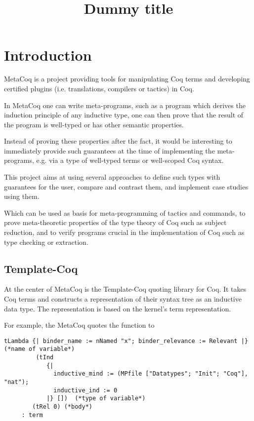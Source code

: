 \documentclass[a4paper,UKenglish,cleveref, autoref, thm-restate]{lipics-v2021}
\title{Dummy title} %
\begin{document}

\section{Introduction}



MetaCoq \cite{metacoq} is a project providing tools for manipulating Coq terms and developing certified plugins (i.e. translations, compilers or tactics) in Coq.

In MetaCoq one can write meta-programs, such as a program which derives the induction principle of any inductive type, one can then prove that the result of the program is well-typed or has other semantic properties.

Instead of proving these properties after the fact, it would be interesting to immediately provide such guarantees at the time of implementing the meta-programs, e.g. via a type of well-typed terms or well-scoped Coq syntax.

This project aims at using several approaches to define such types with guarantees for the user, compare and contrast them, and implement case studies using them.

Which can be used as basis for meta-programming of tactics and commands, to prove meta-theoretic properties of the type theory of Coq such as subject reduction, and to verify programs crucial in the implementation of Coq such as type checking or extraction.

\subsection{Template-Coq}

At the center of MetaCoq is the Template-Coq quoting library for Coq. It takes Coq terms and constructs a representation of their syntax tree as an inductive data type. The representation is based on the kernel's term representation.

For example, the MetaCoq quotes the function  to 

\begin{lstlisting}[language = {Coq}, basicstyle = \small]
tLambda {| binder_name := nNamed "x"; binder_relevance := Relevant |} (*name of variable*)
         (tInd
            {|
              inductive_mind := (MPfile ["Datatypes"; "Init"; "Coq"], "nat");
              inductive_ind := 0
            |} [])  (*type of variable*)
        (tRel 0) (*body*)
     : term    
\end{lstlisting}
\end{document}
